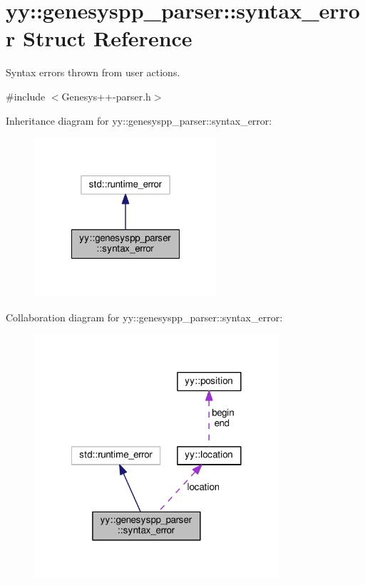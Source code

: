 \hypertarget{structyy_1_1genesyspp__parser_1_1syntax__error}{\section{yy\-:\-:genesyspp\-\_\-parser\-:\-:syntax\-\_\-error Struct Reference}
\label{structyy_1_1genesyspp__parser_1_1syntax__error}
}


Syntax errors thrown from user actions.  




{\ttfamily \#include $<$Genesys++-\/parser.\-h$>$}



Inheritance diagram for yy\-:\-:genesyspp\-\_\-parser\-:\-:syntax\-\_\-error\-:
\nopagebreak
\begin{figure}[H]
\begin{center}
\leavevmode
\includegraphics[width=192pt]{structyy_1_1genesyspp__parser_1_1syntax__error__inherit__graph}
\end{center}
\end{figure}


Collaboration diagram for yy\-:\-:genesyspp\-\_\-parser\-:\-:syntax\-\_\-error\-:
\nopagebreak
\begin{figure}[H]
\begin{center}
\leavevmode
\includegraphics[width=257pt]{structyy_1_1genesyspp__parser_1_1syntax__error__coll__graph}
\end{center}
\end{figure}
